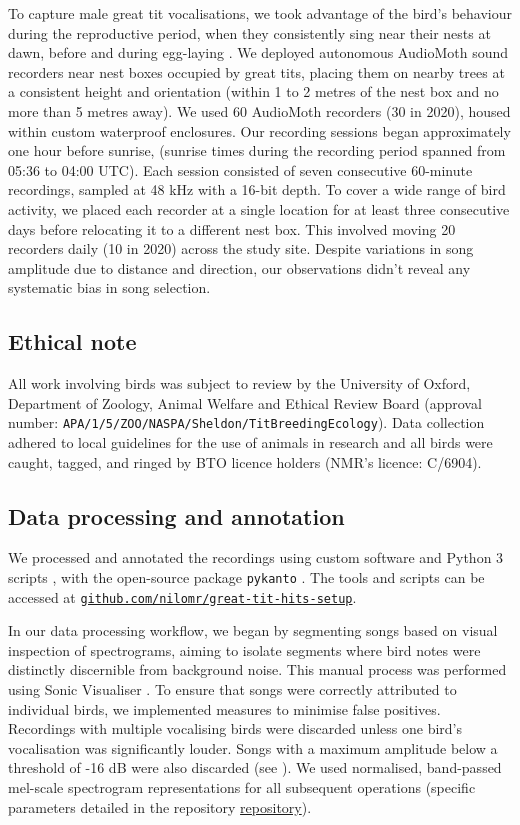 To capture male great tit vocalisations, we took advantage of the bird's behaviour during the reproductive period, when they consistently sing near their nests at dawn, before and during egg-laying \parencite{mace1987}. We deployed autonomous AudioMoth \autocite{hill2019} sound recorders near nest boxes occupied by great tits, placing them on nearby trees at a consistent height and orientation (within 1 to 2 metres of the nest box and no more than 5 metres away). We used 60 AudioMoth recorders (30 in 2020), housed within custom waterproof enclosures. Our recording sessions began approximately one hour before sunrise, (sunrise times during the recording period spanned from 05:36 to 04:00 UTC). Each session consisted of seven consecutive 60-minute recordings, sampled at 48 kHz with a 16-bit depth. To cover a wide range of bird activity, we placed each recorder at a single location for at least three consecutive days before relocating it to a different nest box. This involved moving 20 recorders daily (10 in 2020) across the study site. Despite variations in song amplitude due to distance and direction, our observations didn't reveal any systematic bias in song selection.

\subsection{Ethical note}
All work involving birds was subject to review by the University of Oxford, Department of Zoology, Animal Welfare and Ethical Review Board (approval number: \nolinkurl{APA/1/5/ZOO/NASPA/Sheldon/TitBreedingEcology}). Data collection adhered to local guidelines for the use of animals in research and all birds were caught, tagged, and ringed by BTO licence holders (NMR's licence: C/6904).

\subsection{Data processing and annotation}

We processed and annotated the recordings using custom software and Python 3 scripts \parencite{vanrossum1995}, with the open-source package \texttt{pykanto} \parencite{merinorecalde2023}. The tools and scripts can be accessed at \href{https://github.com/nilomr/great-tit-hits-setup}{\nolinkurl{github.com/nilomr/great-tit-hits-setup}}. 

\noindent In our data processing workflow, we began by segmenting songs based on visual inspection of spectrograms, aiming to isolate segments where bird notes were distinctly discernible from background noise. This manual process was performed using Sonic Visualiser \parencite{cannam2010}. To ensure that songs were correctly attributed to individual birds, we implemented measures to minimise false positives. Recordings with multiple vocalising birds were discarded unless one bird's vocalisation was significantly louder. Songs with a maximum amplitude below a threshold of -16 dB were also discarded (see \cite{merinorecalde2023a}). We used normalised, band-passed mel-scale spectrogram representations for all subsequent operations (specific parameters detailed in the repository \href{https://github.com/nilomr/great-tit-hits-setup}{repository}).

